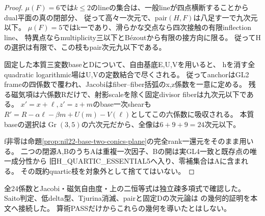 \documentclass[a4paper,11pt]{ltjsarticle}
\theoremstyle{definition}
\begin{document}
\begin{proof}
$\mu(F)=6$では$k\le2$のlineの集合は、一般lineが四点横断することからdual平面の真の閉部分、
従って高々一次元で、pair$(H,F)$は八足す一で九次元以下。
$\mu(F)=5$ではk一であり、滑らかな交点なら四次接触の有限inflection line、
特異点ならmultiplicity三以下とBézoutから有限の接方向に限る。
従ってHの選択は有限で、この枝もpair次元九以下である。

固定した本質三変数baseとDについて、自由基底E,U,Vを用いると、
hを消す全quadratic logarithmic場はU,Vの定数結合で尽くされる。
従ってanchorはGL2 frameの四係数で覆われ、Jacobiはfiber--fiber括弧のx,z係数を一意に定める。
残る磁気項は六係数Rだけで、射影scaleを除く固定divisor fiberは九次元以下である。
$x'=x+\ell,z'=z+m$のbase一次shearも
$R'=R-\alpha\ell-\beta m+U(m)-V(\ell)$としてこの六係数に吸収される。
本質baseの選択は$\operatorname{Gr}(3,5)$の六次元だから、全像は$6+9+9=24$次元以下。

f非零は命題\ref{prop:nil22-base-two-conics-plane}の完全rank一還元をそのまま用いる。
二つの閉源A,BのうちAは重複一次因子、Bの開は実GL4一致と既存点の唯一成分性から
旧H\_QUARTIC\_ESSENTIAL5へ入り、零補集合はAに含まれる。
その既約quartic枝を対象外として捨ててはいない。
\end{proof}
全24係数とJacobi・磁気自由度・上の二恒等式は独立疎多項式で確認した。
Saito判定、低delta型、Tjurina消滅、pairと固定Dの次元論は
の幾何的証明を本文へ接続した。
算術PASSだけからこれらの幾何を導いたとはしない。
\end{document}
